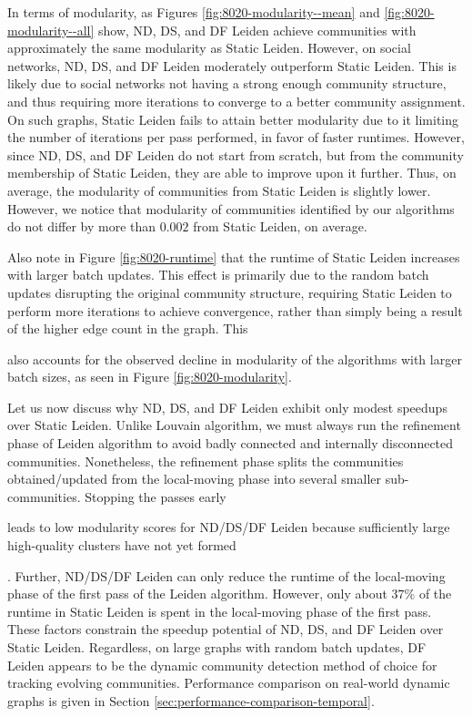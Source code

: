 In terms of modularity, as Figures \ref{fig:8020-modularity--mean} and \ref{fig:8020-modularity--all} show, ND, DS, and DF Leiden achieve communities with approximately the same modularity as Static Leiden. However, on social networks, ND, DS, and DF Leiden moderately outperform Static Leiden. This is likely due to social networks not having a strong enough community structure, and thus requiring more iterations to converge to a better community assignment. On such graphs, Static Leiden fails to attain better modularity due to it limiting the number of iterations per pass performed, in favor of faster runtimes. However, since ND, DS, and DF Leiden do not start from scratch, but from the community membership of Static Leiden, they are able to improve upon it further. Thus, on average, the modularity of communities from Static Leiden is slightly lower. However, we notice that modularity of communities identified by our algorithms do not differ by more than $0.002$ from Static Leiden, on average.

Also note in Figure \ref{fig:8020-runtime} that the runtime of Static Leiden increases with larger batch updates. This effect is primarily due to the random batch updates disrupting the original community structure, requiring Static Leiden to perform more iterations to achieve convergence, rather than simply being a result of the higher edge count in the graph. This also accounts for the observed decline in modularity of the algorithms with larger batch sizes, as seen in Figure \ref{fig:8020-modularity}.

Let us now discuss why ND, DS, and DF Leiden exhibit only modest speedups over Static Leiden. Unlike Louvain algorithm, we must always run the refinement phase of Leiden algorithm to avoid badly connected and internally disconnected communities. Nonetheless, the refinement phase splits the communities obtained/updated from the local-moving phase into several smaller sub-communities. Stopping the passes early leads to low modularity scores for ND/DS/DF Leiden because sufficiently large high-quality clusters have not yet formed. Further, ND/DS/DF Leiden can only reduce the runtime of the local-moving phase of the first pass of the Leiden algorithm. However, only about $37\%$ of the runtime in Static Leiden is spent in the local-moving phase of the first pass. These factors constrain the speedup potential of ND, DS, and DF Leiden over Static Leiden. Regardless, on large graphs with random batch updates, DF Leiden appears to be the dynamic community detection method of choice for tracking evolving communities. Performance comparison on real-world dynamic graphs is given in Section \ref{sec:performance-comparison-temporal}.




